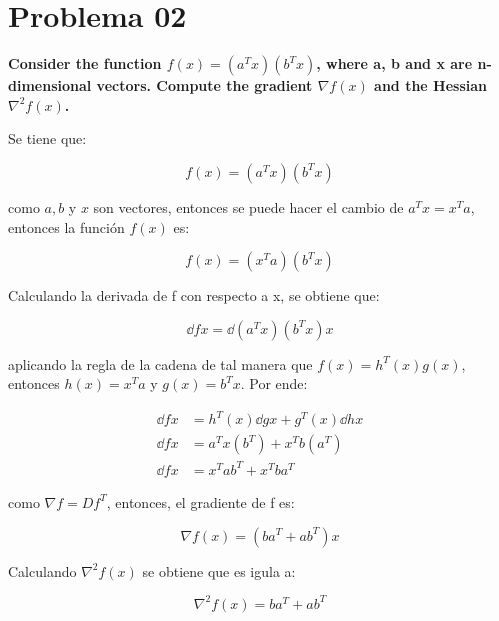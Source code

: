 \section*{Problema 02}

\textbf{Consider the function $f(x)=(a^Tx)(b^Tx)$, where a, b and x are n-dimensional vectors. Compute the gradient $\nabla f(x)$ and the Hessian $\nabla^2 f(x)$.}

Se tiene que:

\begin{equation*}
    f(x)  =  (a^Tx)(b^Tx)
\end{equation*}

como $a,b$ y $x$ son vectores, entonces se puede hacer el cambio de $a^T x = x^Ta$, entonces la función $f(x)$ es:

\begin{equation*}
    f(x)  =  (x^Ta)(b^Tx)
\end{equation*}

Calculando la derivada de f con respecto a x, se obtiene que:

\begin{equation*}
    \dd{f}{x} = \dd{(a^Tx)(b^Tx)}{x}
\end{equation*}

aplicando la regla de la cadena de tal manera que $f(x)=h^T(x)g(x)$, entonces $h(x)=x^Ta$ y $g(x)=b^Tx$. Por ende:

\begin{align*}
    \dd{f}{x} & = h^T(x)\dd{g}{x} + g^T(x) \dd{h}{x} \\[3pt]
    \dd{f}{x} & = a^Tx(b^T) + x^Tb(a^T)              \\[3pt]
    \dd{f}{x} & = x^Tab^T + x^Tba^T
\end{align*}

como $\nabla f = Df^T$, entonces, el gradiente de f es:

\begin{equation*}
    \nabla f(x) = (ba^T+ab^T)x
\end{equation*}

Calculando $\nabla^2 f(x)$ se obtiene que es igula a:

\begin{equation*}
    \nabla^2 f(x)= ba^T+ab^T
\end{equation*}